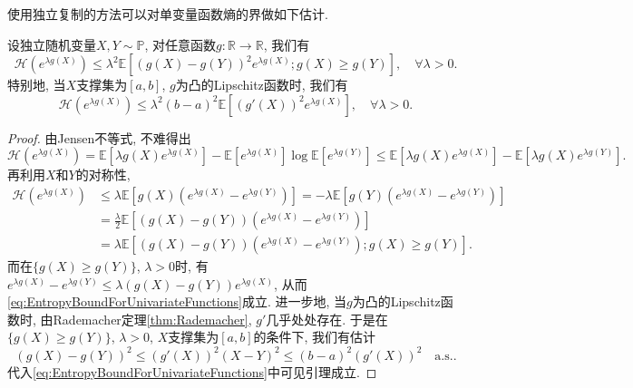 使用独立复制的方法可以对单变量函数熵的界做如下估计. 
\begin{lemma}[单变量函数熵的界]\label{lemma:EntropyBoundForUnivariateFunctions}
	设独立随机变量$X, Y \sim \mathbb{P}$, 对任意函数$g \colon \mathbb{R} \to \mathbb{R}$, 我们有
	\begin{equation}\label{eq:EntropyBoundForUnivariateFunctions}
		\mathcal{H}(e^{\lambda g(X)})
		\leq \lambda^2 \mathbb{E}[ (g(X) - g(Y))^2 e^{\lambda g(X)}; g(X) \geq g(Y) ], \quad \forall \lambda > 0.
	\end{equation}
	特别地, 当$X$支撑集为$[a, b]$, $g$为凸的Lipschitz函数时, 我们有
	\begin{equation*}
		\mathcal{H}(e^{\lambda g(X)}) 
		\leq \lambda^2 (b-a)^2 \mathbb{E}[(g'(X))^2 e^{\lambda g(X)}], \quad \forall \lambda > 0.
	\end{equation*}
\end{lemma}
\begin{proof}
	由Jensen不等式, 不难得出
	\begin{equation*}
		\mathcal{H}(e^{\lambda g(X)})
		= \mathbb{E}[\lambda g(X) e^{\lambda g(X)}] - \mathbb{E}[e^{\lambda g(X)}] \log \mathbb{E}[e^{\lambda g(Y)}] 
		\leq \mathbb{E}[\lambda g(X) e^{\lambda g(X)}] - \mathbb{E}[\lambda g(X) e^{\lambda g(Y)}].
	\end{equation*}
	再利用$X$和$Y$的对称性, 
	\begin{align*}
		\mathcal{H}(e^{\lambda g(X)})
		&\leq \lambda \mathbb{E}[ g(X) (e^{\lambda g(X)}-  e^{\lambda g(Y)})] 
		= - \lambda \mathbb{E}[ g(Y) (e^{\lambda g(X)}-  e^{\lambda g(Y)})] \\
		&= \frac{\lambda}{2} \mathbb{E}\left[(g(X) - g(Y)) (e^{\lambda g(X)} - e^{\lambda g(Y)})\right] \\
		&= \lambda \mathbb{E}\left[(g(X) - g(Y)) (e^{\lambda g(X)} - e^{\lambda g(Y)}); g(X) \geq g(Y) \right].
	\end{align*}
	而在$\{g(X) \geq g(Y)\}$, $\lambda > 0$时, 有$e^{\lambda g(X)} - e^{\lambda g(Y)} \leq \lambda(g(X) - g(Y)) e^{\lambda g(X)}$, 从而\eqref{eq:EntropyBoundForUnivariateFunctions}成立. 
	进一步地, 当$g$为凸的Lipschitz函数时, 由Rademacher定理\ref{thm:Rademacher}, $g'$几乎处处存在. 
	于是在$\{g(X) \geq g(Y)\}$, $\lambda > 0$, $X$支撑集为$[a, b]$的条件下, 我们有估计
	\begin{equation*}
		(g(X) - g(Y))^2 \leq (g'(X))^2 (X-Y)^2 \leq (b-a)^2 (g'(X))^2 \quad \text{a.s.}.
	\end{equation*}
	代入\eqref{eq:EntropyBoundForUnivariateFunctions}中可见引理成立. 
\end{proof}

